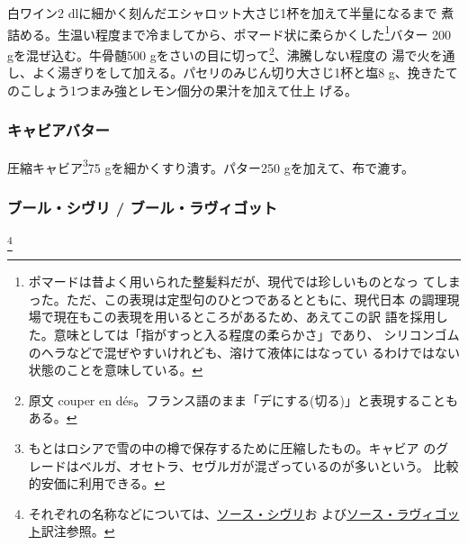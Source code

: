 \begin{recette}
白ワイン2 dlに細かく刻んだエシャロット大さじ1杯を加えて半量になるまで
煮詰める。生温い程度まで冷ましてから、ポマード状に柔らかくした\footnote{ポマードは昔よく用いられた整髪料だが、現代では珍しいものとなっ
  てしまった。ただ、この表現は定型句のひとつであるとともに、現代日本
  の調理現場で現在もこの表現を用いるところがあるため、あえてこの訳
  語を採用した。意味としては「指がすっと入る程度の柔らかさ」であり、
  シリコンゴムのヘラなどで混ぜやすいけれども、溶けて液体にはなってい
  るわけではない状態のことを意味している。}バター 200
gを混ぜ込む。牛骨髄500 gをさいの目に切って\footnote{原文 couper en
  dés。フランス語のまま「デにする(切る)」と表現することもある。}、沸騰しない程度の
湯で火を通し、よく湯ぎりをして加える。パセリのみじん切り大さじ1杯と塩8
g、挽きたてのこしょう1つまみ強とレモン\undemi{}個分の果汁を加えて仕上
げる。

\maeaki

\hypertarget{beurre-de-caviar}{%
\subsubsection{キャビアバター}\label{beurre-de-caviar}}



圧縮キャビア\footnote{もとはロシアで雪の中の樽で保存するために圧縮したもの。キャビア
  のグレードはベルガ、オセトラ、セヴルガが混ざっているのが多いという。
  比較的安価に利用できる。}75 gを細かくすり潰す。パター250
gを加えて、布で漉す。

\maeaki

\hypertarget{beurre-chivry}{%
\subsubsection{ブール・シヴリ /
ブール・ラヴィゴット}\label{beurre-chivry}}

\footnote{それぞれの名称などについては、\protect\hyperlink{sacue-chivry}{ソース・シヴリ}お
  よび\protect\hyperlink{sauce-ravigote}{ソース・ラヴィゴット}訳注参照。}



\end{recette}
